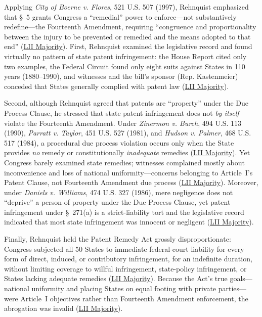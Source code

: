 \documentclass[12pt]{article}
\begin{document}
Applying \textit{City of Boerne v. Flores}, 521 U.S. 507 (1997), Rehnquist emphasized that \S~5 grants Congress a ``remedial'' power to enforce---not substantively redefine---the Fourteenth Amendment, requiring ``congruence and proportionality between the injury to be prevented or remedied and the means adopted to that end'' (\href{https://www.law.cornell.edu/supct/html/98-531.ZO.html}{LII Majority}). First, Rehnquist examined the legislative record and found virtually no pattern of state patent infringement: the House Report cited only two examples, the Federal Circuit found only eight suits against States in 110 years (1880--1990), and witnesses and the bill's sponsor (Rep. Kastenmeier) conceded that States generally complied with patent law (\href{https://www.law.cornell.edu/supct/html/98-531.ZO.html}{LII Majority}).

Second, although Rehnquist agreed that patents are ``property'' under the Due Process Clause, he stressed that state patent infringement does not \textit{by itself} violate the Fourteenth Amendment. Under \textit{Zinermon v. Burch}, 494 U.S. 113 (1990), \textit{Parratt v. Taylor}, 451 U.S. 527 (1981), and \textit{Hudson v. Palmer}, 468 U.S. 517 (1984), a procedural due process violation occurs only when the State provides \textit{no} remedy or constitutionally \textit{inadequate} remedies (\href{https://www.law.cornell.edu/supct/html/98-531.ZO.html}{LII Majority}). Yet Congress barely examined state remedies; witnesses complained mostly about inconvenience and loss of national uniformity---concerns belonging to Article~I's Patent Clause, not Fourteenth Amendment due process (\href{https://www.law.cornell.edu/supct/html/98-531.ZO.html}{LII Majority}). Moreover, under \textit{Daniels v. Williams}, 474 U.S. 327 (1986), mere negligence does not ``deprive'' a person of property under the Due Process Clause, yet patent infringement under \S~271(a) is a strict-liability tort and the legislative record indicated that most state infringement was innocent or negligent (\href{https://www.law.cornell.edu/supct/html/98-531.ZO.html}{LII Majority}).

Finally, Rehnquist held the Patent Remedy Act grossly disproportionate: Congress subjected all 50 States to immediate federal-court liability for every form of direct, induced, or contributory infringement, for an indefinite duration, without limiting coverage to willful infringement, state-policy infringement, or States lacking adequate remedies (\href{https://www.law.cornell.edu/supct/html/98-531.ZO.html}{LII Majority}). Because the Act's true goals---national uniformity and placing States on equal footing with private parties---were Article~I objectives rather than Fourteenth Amendment enforcement, the abrogation was invalid (\href{https://www.law.cornell.edu/supct/html/98-531.ZO.html}{LII Majority}).
\end{document}
